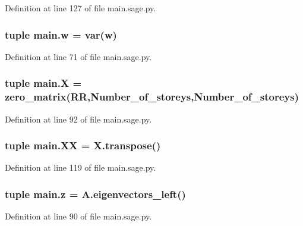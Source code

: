 Definition at line 127 of file main.\+sage.\+py.

\hypertarget{namespacemain_af76005101c339a32cd5d37ba82ee072c}{}
\subsubsection[{w}]{\setlength{\rightskip}{0pt plus 5cm}tuple main.\+w = var(\textquotesingle{}w\textquotesingle{})}\label{namespacemain_af76005101c339a32cd5d37ba82ee072c}


Definition at line 71 of file main.\+sage.\+py.

\hypertarget{namespacemain_a5eac8e4368036ef94463d6e42c1628c5}{}
\subsubsection[{X}]{\setlength{\rightskip}{0pt plus 5cm}tuple main.\+X = zero\+\_\+matrix(R\+R,Number\+\_\+of\+\_\+storeys,Number\+\_\+of\+\_\+storeys)}\label{namespacemain_a5eac8e4368036ef94463d6e42c1628c5}


Definition at line 92 of file main.\+sage.\+py.

\hypertarget{namespacemain_ae18df6a00aee4516c7ad8961b666e2a3}{}
\subsubsection[{X\+X}]{\setlength{\rightskip}{0pt plus 5cm}tuple main.\+X\+X = X.\+transpose()}\label{namespacemain_ae18df6a00aee4516c7ad8961b666e2a3}


Definition at line 119 of file main.\+sage.\+py.

\hypertarget{namespacemain_a2d5b336e3b2f7d2e14f04fa3cc413457}{}
\subsubsection[{z}]{\setlength{\rightskip}{0pt plus 5cm}tuple main.\+z = A.\+eigenvectors\+\_\+left()}\label{namespacemain_a2d5b336e3b2f7d2e14f04fa3cc413457}


Definition at line 90 of file main.\+sage.\+py.

